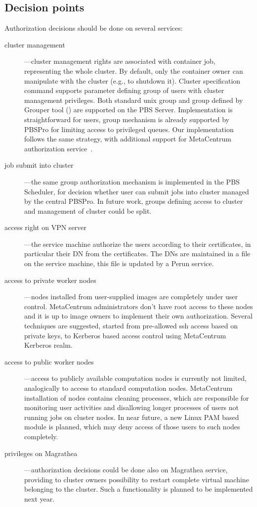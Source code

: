 \documentclass[a4paper]{article}
\begin{document}
\subsection{Decision points}
Authorization decisions should be done on several services:
\begin{description}
\item[cluster management]---cluster management rights are associated with
container job, representing the whole cluster. 
By default, only the container owner can manipulate with the cluster (e.g.,
to shutdown it). Cluster specification 
command supports parameter defining group of users with cluster management privileges. Both standard unix group and group 
defined by Grouper tool (\cite{grouper}) are supported on the PBS Server. Implementation is straightforward for users, 
group mechanism is already supported by PBSPro for limiting access to privileged queues. Our implementation follows the same strategy, 
with additional support for MetaCentrum authorization service~\cite{metaauth}. 
\item[job submit into cluster]---the same group authorization mechanism is
implemented in the PBS Scheduler, for decision 
whether user can submit jobs into cluster managed by the central PBSPro. In future work, groups defining access to cluster and management of
cluster could be split.
\item[access right on VPN server]---the service machine authorize the users
according to their certificates, in particular their DN from the certificates.
The DNs are maintained in a file on the service machine, this file is updated
by a Perun service.
\item[access to private worker nodes]---nodes installed from user-supplied images are completely under user control. MetaCentrum 
administrators don't have root access to these nodes and it is up to image owners to implement their own authorization. Several 
techniques are suggested, started from pre-allowed ssh access based on
private keys, to Kerberos based access control using MetaCentrum
Kerberos realm.
\item[access to public worker nodes]---access to publicly available
computation nodes is currently not limited, analogically to access to
standard computation nodes. MetaCentrum installation of nodes contains cleaning processes, which are responsible for monitoring user activities
and disallowing longer processes of users not running jobs on cluster
nodes. In near future, a new Linux PAM based module is planned, which
may deny access of those users to such nodes completely.

\item[privileges on Magrathea]---authorization decisions could be done also on Magrathea service, providing to cluster owners possibility 
to restart complete virtual machine belonging to the cluster. Such a
functionality is planned to be implemented next year.
\end{description}
\end{document}
